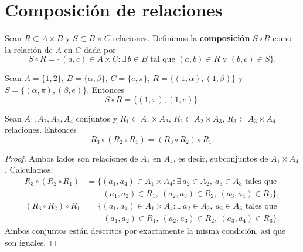 \documentclass[12pt,a4paper]{book}
\begin{document}
    \section{Composición de relaciones}

    \begin{definicion}
        Sean $R\subset A\times B$ y $S\subset B\times C$ relaciones. Definimos la \textbf{composición} $S\circ R$ como la relación de $A$ en $C$ dada por
        \begin{equation*}
            S\circ R = \{(a,c)\in A\times C : \exists\, b\in B \text{ tal que } (a,b)\in R \text{ y } (b,c)\in S\}.
        \end{equation*}
    \end{definicion}

    \begin{ejemplo}
        Sean $A=\{1,2\}$, $B=\{\alpha,\beta\}$, $C=\{e,\pi\}$, $R=\{(1,\alpha),(1,\beta)\}$ y $S=\{(\alpha,\pi),(\beta,e)\}$. Entonces
        \begin{equation*}
            S\circ R = \{(1,\pi),(1,e)\}.
        \end{equation*}
    \end{ejemplo}

    \begin{proposicion}
        Sean $A_1,A_2,A_3,A_4$ conjuntos y $R_1\subset A_1\times A_2$, $R_2\subset A_2\times A_3$, $R_3\subset A_3\times A_4$ relaciones. Entonces
        \begin{equation*}
            R_3\circ(R_2\circ R_1) = (R_3\circ R_2)\circ R_1.
        \end{equation*}
    \end{proposicion}

    \begin{proof}
        Ambos lados son relaciones de $A_1$ en $A_4$, es decir, subconjuntos de $A_1\times A_4$. Calculamos:
        \begin{align*}
            R_3\circ(R_2\circ R_1) &= \{(a_1,a_4)\in A_1\times A_4 : \exists\, a_2\in A_2,\ a_3\in A_3 \text{ tales que } \\
            &\qquad (a_1,a_2)\in R_1,\ (a_2,a_3)\in R_2,\ (a_3,a_4)\in R_3\},
        \end{align*}
        \begin{align*}
            (R_3\circ R_2)\circ R_1 &= \{(a_1,a_4)\in A_1\times A_4 : \exists\, a_2\in A_2,\ a_3\in A_3 \text{ tales que } \\
            &\qquad (a_1,a_2)\in R_1,\ (a_2,a_3)\in R_2,\ (a_3,a_4)\in R_3\}.
        \end{align*}
        Ambos conjuntos están descritos por exactamente la misma condición, así que son iguales.
    \end{proof}
\end{document}
